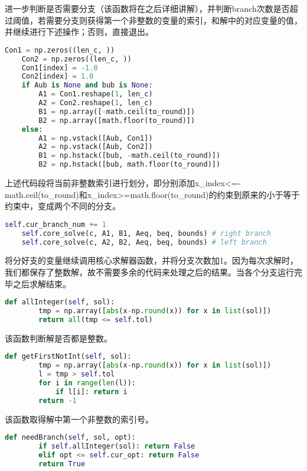 进一步判断是否需要分支（该函数将在之后详细讲解），并判断branch次数是否超过阈值，若需要分支则获得第一个非整数的变量的索引，和解中的对应变量的值，并继续进行下述操作；否则，直接退出。

\begin{lstlisting}[language=python]
	Con1 = np.zeros((len_c, ))
	Con2 = np.zeros((len_c, ))
	Con1[index] = -1.0
	Con2[index] = 1.0
	if Aub is None and bub is None:
		A1 = Con1.reshape(1, len_c)
		A2 = Con2.reshape(1, len_c)
		B1 = np.array([-math.ceil(to_round)])
		B2 = np.array([math.floor(to_round)])
	else:
		A1 = np.vstack([Aub, Con1])
		A2 = np.vstack([Aub, Con2])
		B1 = np.hstack([bub, -math.ceil(to_round)])
		B2 = np.hstack([bub, math.floor(to_round)])
\end{lstlisting}

上述代码段将当前非整数索引进行划分，即分别添加x\_index<=-math.ceil(to\_round)和x\_index>=math.floor(to\_round)的约束到原来的小于等于约束中，变成两个不同的分支。

\begin{lstlisting}[language=python]
	self.cur_branch_num += 1
	self.core_solve(c, A1, B1, Aeq, beq, bounds) # right branch
	self.core_solve(c, A2, B2, Aeq, beq, bounds) # left branch
\end{lstlisting}

将分好支的变量继续调用核心求解器函数，并将分支次数加1。因为每次求解时，我们都保存了整数解，故不需要多余的代码来处理之后的结果。当各个分支运行完毕之后求解结束。

\begin{lstlisting}[language=python]
    def allInteger(self, sol):
        tmp = np.array([abs(x-np.round(x)) for x in list(sol)])
        return all(tmp <= self.tol)
\end{lstlisting}

该函数判断解是否都是整数。

\begin{lstlisting}[language=python]
    def getFirstNotInt(self, sol):
        tmp = np.array([abs(x-np.round(x)) for x in list(sol)])
        l = tmp > self.tol
        for i in range(len(l)):
            if l[i]: return i
        return -1
\end{lstlisting}
该函数取得解中第一个非整数的索引号。

\begin{lstlisting}[language=python]
    def needBranch(self, sol, opt):
        if self.allInteger(sol): return False
        elif opt <= self.cur_opt: return False
        return True
\end{lstlisting}

